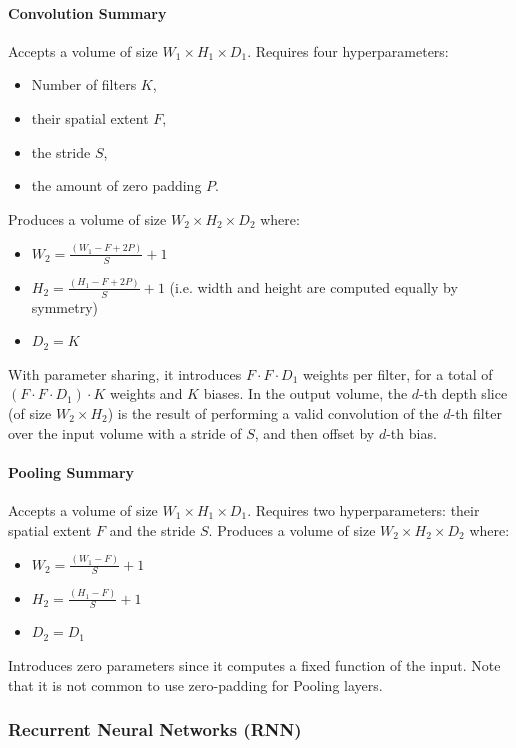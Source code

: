 \paragraph{Convolution Summary}    
Accepts a volume of size $W_1 \times H_1 \times D_1$. Requires four hyperparameters:
    \begin{itemize}
        \item Number of filters $K$,
        \item their spatial extent $F$,
        \item the stride $S$,
        \item the amount of zero padding $P$.
    \end{itemize}
Produces a volume of size $W_2 \times H_2 \times D_2$ where:
    \begin{itemize}
        \item $W_2 = \frac{(W_1 - F + 2P)}{S} + 1$
        \item $H_2 = \frac{(H_1 - F + 2P)}{S} + 1$ (i.e. width and height are computed equally by symmetry)
        \item $D_2 = K$
    \end{itemize}
With parameter sharing, it introduces $F \cdot F \cdot D_1$ weights per filter, for a total of $(F \cdot F \cdot D_1) \cdot K$ weights and $K$ biases. In the output volume, the $d$-th depth slice (of size $W_2 \times H_2$) is the result of performing a valid convolution of the $d$-th filter over the input volume with a stride of $S$, and then offset by $d$-th bias.

\paragraph{Pooling Summary}
Accepts a volume of size $W_1 \times H_1 \times D_1$. Requires two hyperparameters: their spatial extent $F$ and the stride $S$. Produces a volume of size $W_2 \times H_2 \times D_2$ where:
    \begin{itemize}
        \item $W_2 = \frac{(W_1 - F)}{S} + 1$
        \item $H_2 = \frac{(H_1 - F)}{S} + 1$
        \item $D_2 = D_1$
    \end{itemize}
Introduces zero parameters since it computes a fixed function of the input. Note that it is not common to use zero-padding for Pooling layers.

\subsubsection{Recurrent Neural Networks (RNN)}

